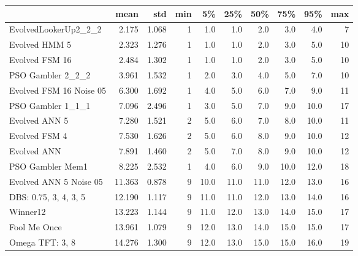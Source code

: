 \begin{tabular}{lrrrrrrrrr}
\toprule
{} &    mean &    std &  min &    5\% &   25\% &   50\% &   75\% &   95\% &  max \\
\midrule
EvolvedLookerUp2\_2\_2    &   2.175 &  1.068 &    1 &   1.0 &   1.0 &   2.0 &   3.0 &   4.0 &    7 \\
Evolved HMM 5           &   2.323 &  1.276 &    1 &   1.0 &   1.0 &   2.0 &   3.0 &   5.0 &   10 \\
Evolved FSM 16          &   2.484 &  1.302 &    1 &   1.0 &   1.0 &   2.0 &   3.0 &   5.0 &   10 \\
PSO Gambler 2\_2\_2       &   3.961 &  1.532 &    1 &   2.0 &   3.0 &   4.0 &   5.0 &   7.0 &   10 \\
Evolved FSM 16 Noise 05 &   6.300 &  1.692 &    1 &   4.0 &   5.0 &   6.0 &   7.0 &   9.0 &   11 \\
PSO Gambler 1\_1\_1       &   7.096 &  2.496 &    1 &   3.0 &   5.0 &   7.0 &   9.0 &  10.0 &   17 \\
Evolved ANN 5           &   7.280 &  1.521 &    2 &   5.0 &   6.0 &   7.0 &   8.0 &  10.0 &   11 \\
Evolved FSM 4           &   7.530 &  1.626 &    2 &   5.0 &   6.0 &   8.0 &   9.0 &  10.0 &   12 \\
Evolved ANN             &   7.891 &  1.460 &    2 &   5.0 &   7.0 &   8.0 &   9.0 &  10.0 &   12 \\
PSO Gambler Mem1        &   8.225 &  2.532 &    1 &   4.0 &   6.0 &   9.0 &  10.0 &  12.0 &   18 \\
Evolved ANN 5 Noise 05  &  11.363 &  0.878 &    9 &  10.0 &  11.0 &  11.0 &  12.0 &  13.0 &   16 \\
DBS: 0.75, 3, 4, 3, 5   &  12.190 &  1.117 &    9 &  11.0 &  11.0 &  12.0 &  13.0 &  14.0 &   16 \\
Winner12                &  13.223 &  1.144 &    9 &  11.0 &  12.0 &  13.0 &  14.0 &  15.0 &   17 \\
Fool Me Once            &  13.961 &  1.079 &    9 &  12.0 &  13.0 &  14.0 &  15.0 &  15.0 &   17 \\
Omega TFT: 3, 8         &  14.276 &  1.300 &    9 &  12.0 &  13.0 &  15.0 &  15.0 &  16.0 &   19 \\
\bottomrule
\end{tabular}
